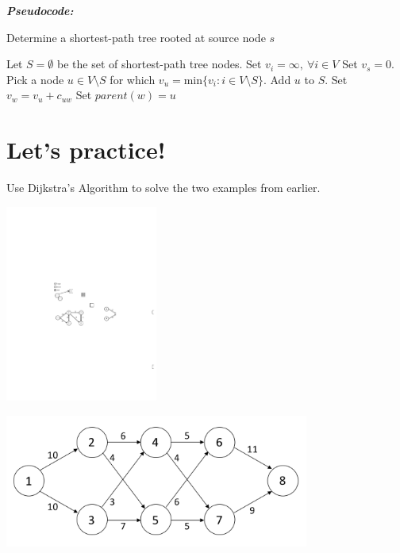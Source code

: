 \documentclass[12pt]{article}
\theoremstyle{definition}
\begin{document}
\emph{\textbf{Pseudocode:}}


\begin{algorithm}
\caption{Determine a shortest-path tree rooted at source node $s$}
\begin{algorithmic} 
\STATE Let $S = \emptyset$ be the set of shortest-path tree nodes.
\STATE Set $v_i = \infty, \ \forall i \in V$
\STATE Set $v_s = 0$.
	\STATE Pick a node $u \in V \setminus S$ for which $v_u = \textrm{min} \{v_i: i \in V\setminus S\}$.
	\STATE Add $u$ to $S$.
			\STATE Set $v_w = v_u + c_{uw}$
			\STATE Set $parent(w) = u$
		\ENDIF
	\ENDFOR

\ENDWHILE
\end{algorithmic}
\end{algorithm}

\newpage

\section*{Let's practice!}

Use Dijkstra's Algorithm to solve the two examples from earlier.

\begin{center}
\includegraphics[width=5cm]{shortestpathexample1}
\end{center}
\vfill

\begin{center}
\includegraphics[width=10cm]{shortestpathexample2}
\end{center}
\end{document}
